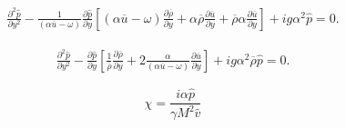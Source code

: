 \begin{equation} 
\begin{split}
\frac{\partial^2 \hat{p}}{\partial y^2}
-
    \frac{1}{
    \left(\alpha \overline{u}-\omega \right)
    }
    \frac{\partial \hat{p}}{\partial y}
\left[
    \left(
        \alpha 
        \overline{u}
        -
        \omega 
    \right)
    \frac{\partial \overline{\rho}}{\partial y}
    +
    \alpha 
    \overline{\rho}
    \frac{\partial \overline{u}}{\partial y}
    +
    \overline{\rho}
    \alpha
    \frac{\partial\overline{u}}{\partial y}
\right]
+
i
g\alpha^2
\hat{p}
=
0
.
\end{split}
\end{equation} 

\begin{equation} 
\begin{split}
\frac{\partial^2 \hat{p}}{\partial y^2}
-
    \frac{\partial \hat{p}}{\partial y}
\left[
    \frac{1}{\overline{\rho}}
    \frac{\partial \overline{\rho}}{\partial y}
    +
    2
    \frac{\alpha }{\left(\alpha \overline{u}-\omega \right)}
    \frac{\partial \overline{u}}{\partial y}
\right]
+
i
g\alpha^2
\overline{\rho}
\hat{p}
=
0
.
\end{split}
\end{equation} 

\begin{equation} 
    \chi
    =
    \frac{i\alpha \hat{p}}{\gamma M^2 \hat{v}}
\end{equation} 


